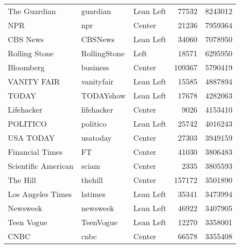 \begin{center}
\begin{longtable}{lllrr}
                             The Guardian &         guardian &     Lean Left &             77532 &    8243012 \\
                                      NPR &              npr &        Center &             21236 &    7959364 \\
                                 CBS News &          CBSNews &     Lean Left &             34060 &    7078950 \\
                            Rolling Stone &     RollingStone &          Left &             18571 &    6295950 \\
                                Bloomberg &         business &        Center &            109367 &    5790419 \\
                              VANITY FAIR &       vanityfair &     Lean Left &             15585 &    4887894 \\
                                    TODAY &        TODAYshow &     Lean Left &             17678 &    4282063 \\
                               Lifehacker &       lifehacker &        Center &              9026 &    4153410 \\
                                 POLITICO &         politico &     Lean Left &             25742 &    4016243 \\
                                USA TODAY &         usatoday &        Center &             27303 &    3949159 \\
                          Financial Times &               FT &        Center &             41030 &    3806483 \\
                      Scientific American &            sciam &        Center &              2335 &    3805593 \\
                                 The Hill &          thehill &        Center &            157172 &    3501890 \\
                        Los Angeles Times &          latimes &     Lean Left &             35341 &    3473994 \\
                                 Newsweek &         newsweek &     Lean Left &             46922 &    3407905 \\
                               Teen Vogue &        TeenVogue &     Lean Left &             12270 &    3358001 \\
                                     CNBC &             cnbc &        Center &             66578 &    3355408 \\

\end{longtable}
\end{center}
